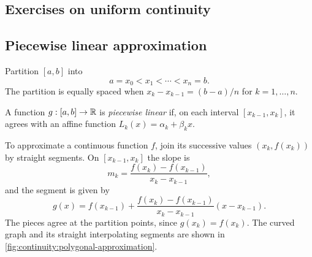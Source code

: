 \subsection{Exercises on uniform continuity}






\subsection{Piecewise linear approximation}

Partition $[a,b]$ into
\[
  a=x_0<x_1<\cdots<x_n=b.
\]
The partition is equally spaced when $x_k-x_{k-1}=(b-a)/n$ for
$k=1,\ldots,n$.

\begin{definition}
  A function $g:[a,b]\to\mathbb{R}$ is \emph{piecewise linear} if, on each
  interval $[x_{k-1},x_k]$, it agrees with an affine function
  $L_k(x)=\alpha_k+\beta_kx$.
\end{definition}

To approximate a continuous function $f$, join its successive values
$(x_k,f(x_k))$ by straight segments. On $[x_{k-1},x_k]$ the slope is
\[
  m_k=\frac{f(x_k)-f(x_{k-1})}{x_k-x_{k-1}},
\]
and the segment is given by
\[
  g(x)=f(x_{k-1})
    +\frac{f(x_k)-f(x_{k-1})}{x_k-x_{k-1}}(x-x_{k-1}).
\]
The pieces agree at the partition points, since $g(x_k)=f(x_k)$.
The curved graph and its straight interpolating
segments are shown in \autoref{fig:continuity:polygonal-approximation}.

\begin{marginfigure}
  \centering
  
  \caption[Joining nearby function values by straight segments.]{The black curve is $f(x)=1+x^2/4$ on $[0,2]$.
    The two gray segments interpolate equally spaced values. Refining the
    partition makes the whole polygonal graph close to the curve.}
  \label{fig:continuity:polygonal-approximation}
\end{marginfigure}

